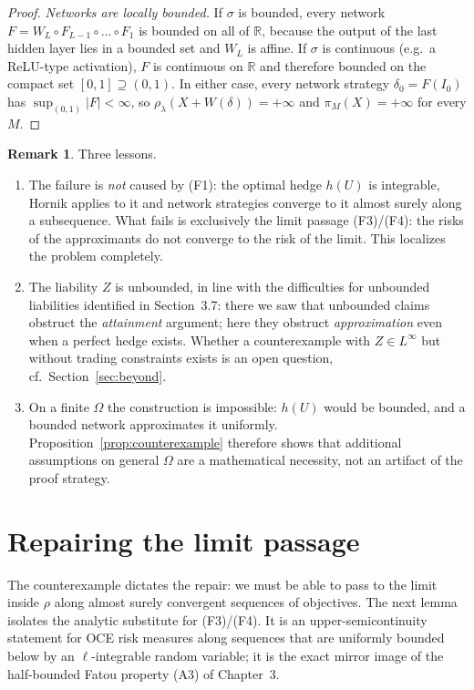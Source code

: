 \documentclass[11pt,a4paper]{report}
\numberwithin{equation}{chapter}
\theoremstyle{plain}
\theoremstyle{definition}
\newtheorem{remark}[proposition]{Remark}
\newcommand{\R}{\mathbb{R}}
\begin{document}
\begin{proof}
    \emph{Networks are locally bounded.} If $\sigma$ is bounded, every network $F=W_L\circ F_{L-1}\circ\dots\circ F_1$ is bounded on all of $\R$, because the output of the last hidden layer lies in a bounded set and $W_L$ is affine. If $\sigma$ is continuous (e.g.\ a ReLU-type activation), $F$ is continuous on $\R$ and therefore bounded on the compact set $[0,1]\supseteq(0,1)$. In either case, every network strategy $\delta_0=F(I_0)$ has $\sup_{(0,1)}|F|<\infty$, so $\rho_\lambda(X+W(\delta))=+\infty$ and $\pi_M(X)=+\infty$ for every $M$.
\end{proof}

\begin{remark}\label{rem:counterexample-lessons}
    Three lessons.
    \begin{enumerate}[leftmargin=*,itemsep=0pt,parsep=0pt]
        \item[\textup{(i)}] The failure is \emph{not} caused by (F1): the optimal hedge $h(U)$ is integrable, Hornik applies to it and network strategies converge to it almost surely along a subsequence. What fails is exclusively the limit passage (F3)/(F4): the risks of the approximants do not converge to the risk of the limit. This localizes the problem completely.
        \item[\textup{(ii)}] The liability $Z$ is unbounded, in line with the difficulties for unbounded liabilities identified in Section~3.7: there we saw that unbounded claims obstruct the \emph{attainment} argument; here they obstruct \emph{approximation} even when a perfect hedge exists. Whether a counterexample with $Z\in L^\infty$ but without trading constraints exists is an open question, cf.\ Section~\ref{sec:beyond}.
        \item[\textup{(iii)}] On a finite $\Omega$ the construction is impossible: $h(U)$ would be bounded, and a bounded network approximates it uniformly. Proposition~\ref{prop:counterexample} therefore shows that additional assumptions on general $\Omega$ are a mathematical necessity, not an artifact of the proof strategy.
    \end{enumerate}
\end{remark}

\section{Repairing the limit passage}\label{sec:repair}

The counterexample dictates the repair: we must be able to pass to the limit inside $\rho$ along almost surely convergent sequences of objectives. The next lemma isolates the analytic substitute for (F3)/(F4). It is an upper-semicontinuity statement for OCE risk measures along sequences that are uniformly bounded below by an $\ell$-integrable random variable; it is the exact mirror image of the half-bounded Fatou property (A3) of Chapter~3.
\end{document}
